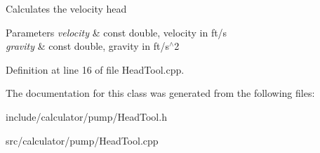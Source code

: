 Calculates the velocity head 
\begin{DoxyParams}{Parameters}
{\em velocity} & const double, velocity in ft/s \\
\hline
{\em gravity} & const double, gravity in ft/s$^\wedge$2 \\
\hline
\end{DoxyParams}


Definition at line 16 of file Head\+Tool.\+cpp.



The documentation for this class was generated from the following files\+:\begin{DoxyCompactItemize}
\item 
include/calculator/pump/Head\+Tool.\+h\item 
src/calculator/pump/Head\+Tool.\+cpp\end{DoxyCompactItemize}
